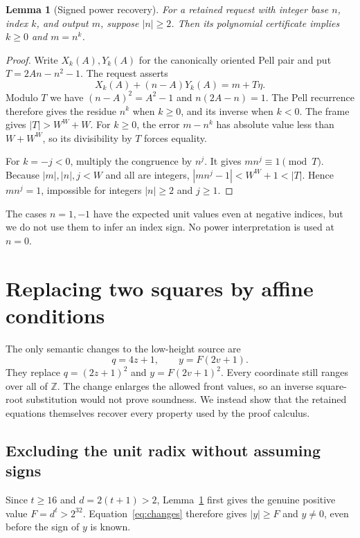 \documentclass[11pt]{article}
\newcommand{\Z}{\mathbb Z}
\newtheorem{lemma}[theorem]{Lemma}
\theoremstyle{remark}\newtheorem{remark}[theorem]{Remark}
\begin{document}
\begin{lemma}[Signed power recovery]\label{lem:power}
For a retained request with integer base $n$, index $k$, and output $m$,
suppose $|n|\ge2$. Then its polynomial certificate implies
$k\ge0$ and $m=n^k$.
\end{lemma}
\begin{proof}
Write $X_k(A),Y_k(A)$ for the canonically oriented Pell pair and put
$T=2An-n^2-1$. The request asserts
\[
 X_k(A)+(n-A)Y_k(A)=m+T\eta.
\]
Modulo $T$ we have $(n-A)^2=A^2-1$ and $n(2A-n)=1$.
The Pell recurrence therefore gives the residue $n^k$ when $k\ge0$,
and its inverse when $k<0$. The frame gives $|T|>W^W+W$.
For $k\ge0$, the error $m-n^k$ has absolute value less than
$W+W^W$, so its divisibility by $T$ forces equality.

For $k=-j<0$, multiply the congruence by $n^j$.
It gives $mn^j\equiv1\pmod T$. Because $|m|,|n|,j<W$ and all
are integers, $|mn^j-1|<W^W+1<|T|$. Hence $mn^j=1$,
impossible for integers $|n|\ge2$ and $j\ge1$.
\end{proof}

The cases $n=1,-1$ have the expected unit values even at negative
indices, but we do not use them to infer an index sign. No power
interpretation is used at $n=0$.

\section{Replacing two squares by affine conditions}

The only semantic changes to the low-height source are
\begin{equation}\label{eq:changes}
 \boxed{q=4z+1,\qquad y=F(2v+1).}
\end{equation}
They replace $q=(2z+1)^2$ and $y=F(2v+1)^2$.
Every coordinate still ranges over all of $\Z$. The change enlarges
the allowed front values, so an inverse square-root substitution would
not prove soundness. We instead show that the retained equations
themselves recover every property used by the proof calculus.

\subsection{Excluding the unit radix without assuming signs}

Since $t\ge16$ and $d=2(t+1)>2$, Lemma~\ref{lem:power} first gives
the genuine positive value $F=d^t>2^{32}$. Equation~\eqref{eq:changes}
therefore gives $|y|\ge F$ and $y\ne0$, even before the sign of $y$
is known.
\end{document}
